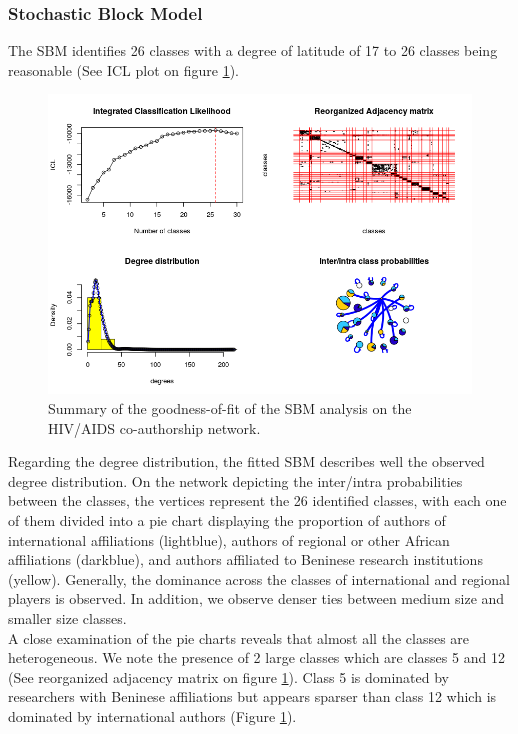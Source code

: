 \subsubsection{Stochastic Block Model}
\label{sec:hiv_results_sbm}
The SBM identifies 26 classes with a degree of latitude of 17 to 26 classes being reasonable (See ICL plot on figure \ref{fig:hiv_sbmgof}).

\begin{figure}[h!]
\centering
\hspace*{-1cm}
\includegraphics[scale=0.85]{Chapters/hiv/statMod/hiv_sbm}
\caption{Summary of the goodness-of-fit of the SBM analysis on the HIV/AIDS co-authorship network.}
\label{fig:hiv_sbmgof}
\end{figure}

Regarding the degree distribution, the fitted SBM describes well the observed degree distribution. On the network depicting the inter/intra probabilities between the classes, the vertices represent the 26 identified classes, with each one of them divided into a pie chart displaying the proportion of authors of international affiliations (lightblue), authors of regional or other African affiliations (darkblue), and authors affiliated to Beninese research institutions (yellow). Generally, the dominance across the classes of international and regional players is observed. In addition, we observe denser ties between medium size and smaller size classes. \\
A close examination of the pie charts reveals that almost all the classes are heterogeneous. We note the presence of 2 large classes which are classes 5 and 12 (See reorganized adjacency matrix on figure \ref{fig:hiv_sbmgof}). Class 5 is dominated by researchers with Beninese affiliations but appears sparser than class 12 which is dominated by international authors (Figure \ref{fig:hiv_sbmgof}). \\

